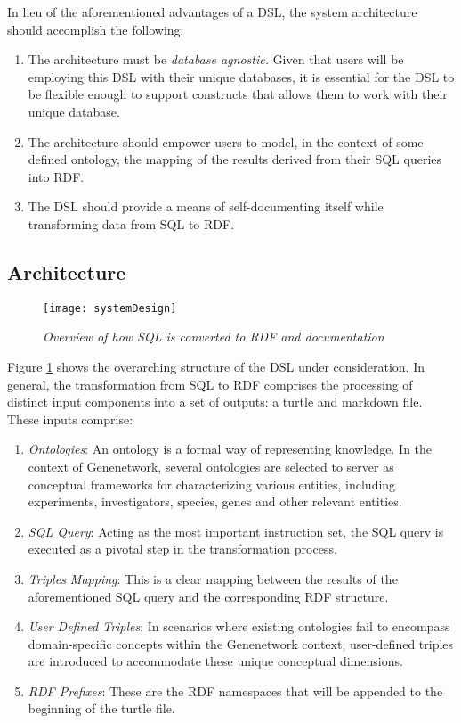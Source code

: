 In lieu of the aforementioned advantages of a DSL, the system architecture should accomplish the following:

\begin{enumerate}
\item The architecture must be \textit{database agnostic.}  Given that users will be employing this DSL with their unique databases, it is essential for the DSL to be flexible enough to support constructs that allows them to work with their unique database.
\item The architecture should empower users to model, in the context of some defined ontology, the mapping of the results derived from their SQL queries into RDF.
\item The DSL should provide a means of self-documenting itself while transforming data from SQL to RDF.
\end{enumerate}

\subsection{Architecture}
\begin{figure}[H]
  \centering
  \texttt{[image: systemDesign]}
  \caption{\textit{Overview of how SQL is converted to RDF and documentation}}
  \label{fig:system-diagram}
  \centering
\end{figure}

Figure \ref{fig:system-diagram} shows the overarching structure of the DSL under consideration.  In general, the transformation from SQL to RDF comprises the processing of distinct input components into a set of outputs: a turtle and markdown file.  These inputs comprise:

\begin{enumerate}
\item \textit{Ontologies}: An ontology is a formal way of representing knowledge.  In the context of Genenetwork, several ontologies are selected to server as conceptual frameworks for characterizing various entities, including experiments, investigators, species, genes and other relevant entities.
\item \textit{SQL Query}: Acting as the most important instruction set, the SQL query is executed as a pivotal step in the transformation process.
\item \textit{Triples Mapping}: This is a clear mapping between the results of the aforementioned SQL query and the corresponding RDF structure.
\item \textit{User Defined Triples}: In scenarios where existing ontologies fail to encompass domain-specific concepts within the Genenetwork context, user-defined triples are introduced to accommodate these unique conceptual dimensions.
\item \textit{RDF Prefixes}: These are the RDF namespaces that will be appended to the beginning of the turtle file.
\end{enumerate}

